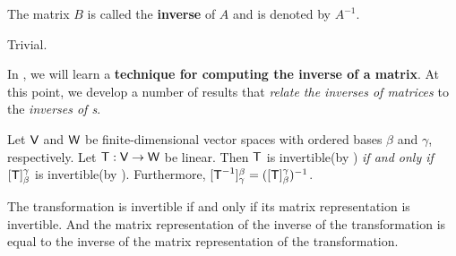  The matrix \(B\) is called the \textbf{inverse} of \(A\) and is denoted by \(A^{-1}\).

\begin{example} \label{example 2.4.2}
Trivial.
\end{example}

In , we will learn a \textbf{technique for computing the inverse of a matrix}.
At this point, we develop a number of results that \emph{relate the inverses of matrices} to the \emph{inverses of \LTRAN{}s}.

\begin{theorem} \label{thm 2.18}
Let \(\textsf{V}\) and \(\textsf{W}\) be finite-dimensional vector spaces with ordered bases \(\beta\) and \(\gamma\), respectively.
Let \(\textsf{T} : \textsf{V} \to \textsf{W}\) be linear.
Then \(\textsf{T}\) is invertible(by ) \emph{if and only if} \([\textsf{T}]_{\beta}^{\gamma}\) is invertible(by ).
Furthermore, \([\textsf{T}^{-1}]_{\gamma}^{\beta} = ([\textsf{T}]_{\beta}^{\gamma})^{-1}\).
\end{theorem}

\begin{note}
The transformation is invertible if and only if its matrix representation is invertible.
And the matrix representation of the inverse of the transformation is equal to the inverse of the matrix representation of the transformation.
\end{note}

